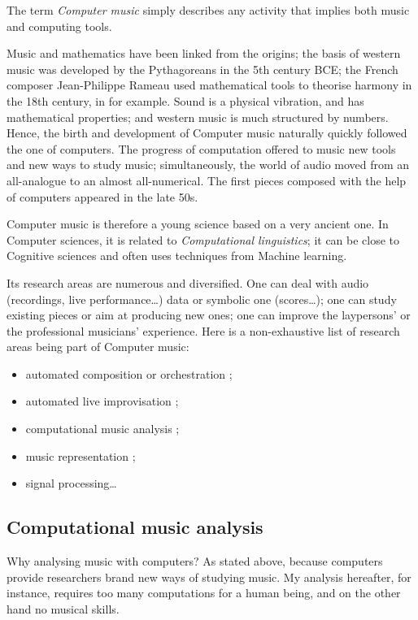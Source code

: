 \documentclass[a4paper,10pt]{article}
\begin{document}
The term \emph{Computer music} simply describes any activity that implies both music and computing tools.

Music and mathematics have been linked from the origins; the basis of western music was developed by the Pythagoreans in the 5th century BCE; the French composer Jean-Philippe Rameau used mathematical tools to theorise harmony in the 18th century, in \cite{rameau} for example. Sound is a physical vibration, and has mathematical properties; and western music is much structured by numbers. Hence, the birth and development of Computer music naturally quickly followed the one of computers. The progress of computation offered to music new tools and new ways to study music; simultaneously, the world of audio moved from an all-analogue to an almost all-numerical. The first pieces composed with the help of computers appeared in the late 50s.

Computer music is therefore a young science based on a very ancient one. In Computer sciences, it is related to \emph{Computational linguistics}; it can be close to Cognitive sciences and often uses techniques from Machine learning.

Its research areas are numerous and diversified. One can deal with audio (recordings, live performance\dots) data or symbolic one (scores\dots); one can study existing pieces or aim at producing new ones; one can improve the laypersons' or the professional musicians' experience. Here is a non-exhaustive list of research areas being part of Computer music:
\begin{itemize}
\item automated composition or orchestration ;
\item automated live improvisation ;
\item computational music analysis ;
\item music representation ;
\item signal processing\dots
\end{itemize}

\subsection{Computational music analysis}

Why analysing music with computers? As stated above, because computers provide researchers brand new ways of studying music. My analysis hereafter, for instance, requires too many computations for a human being, and on the other hand no musical skills.
\end{document}
